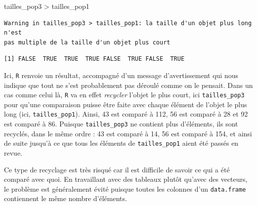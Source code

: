 \documentclass[
  a4paper,
  DIV=11,
  numbers=noendperiod,
  oneside]{scrreprt}
\newenvironment{Shaded}{}{}
\newcommand{\NormalTok}[1]{\textcolor[rgb]{0.14,0.16,0.18}{#1}}
\newcommand{\SpecialCharTok}[1]{\textcolor[rgb]{0.00,0.36,0.77}{#1}}
\begin{document}
\begin{Shaded}
\begin{Highlighting}[]
\NormalTok{tailles\_pop3 }\SpecialCharTok{\textgreater{}}\NormalTok{ tailles\_pop1}
\end{Highlighting}
\end{Shaded}

\begin{verbatim}
Warning in tailles_pop3 > tailles_pop1: la taille d'un objet plus long n'est
pas multiple de la taille d'un objet plus court
\end{verbatim}

\begin{verbatim}
[1] FALSE  TRUE  TRUE  TRUE FALSE  TRUE FALSE  TRUE
\end{verbatim}

Ici, \texttt{R} renvoie un résultat, accompagné d'un message
d'avertissement qui nous indique que tout ne s'est probablement pas
déroulé comme on le pensait. Dans un cas comme celui là, \texttt{R} va
en effet \emph{recycler} l'objet le plus court, ici
\texttt{tailles\_pop3} pour qu'une comparaison puisse être faite avec
chaque élément de l'objet le plus long (ici, \texttt{tailles\_pop1}).
Ainsi, 43 est comparé à 112, 56 est comparé à 28 et 92 est comparé à 86.
Puisque \texttt{tailles\_pop3} ne contient plus d'éléments, ils sont
recyclés, dans le même ordre : 43 est comparé à 14, 56 est comparé à
154, et ainsi de suite jusqu'à ce que tous les éléments de
\texttt{tailles\_pop1} aient été passés en revue.

Ce type de recyclage est très risqué car il est difficile de savoir ce
qui a été comparé avec quoi. En travaillant avec des tableaux plutôt
qu'avec des vecteurs, le problème est généralement évité puisque toutes
les colonnes d'un \texttt{data.frame} contiennent le même nombre
d'éléments.
\end{document}
